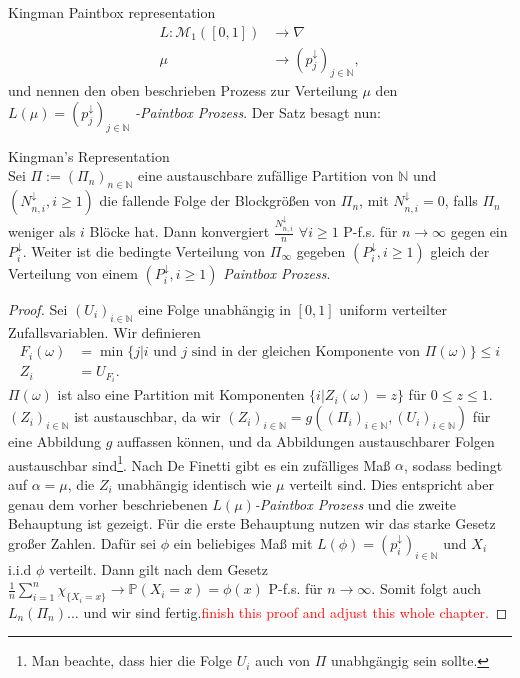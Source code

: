 \begin{section}{Kingman Paintbox representation}
\begin{align*}
L: \mathcal{M}_1([0,1]) &\to \nabla \\
\mu \hspace{20pt} &\to (p_j^\downarrow)_{j \in \mathbb{N}},
\end{align*}
und nennen den oben beschrieben Prozess zur Verteilung $\mu$ den $L(\mu) = (p_j^\downarrow)_{j \in \mathbb{N}}$ \textit{-Paintbox Prozess}. Der Satz besagt nun:
\begin{theorem}
\textnormal{Kingman's Representation}\\
    Sei $\Pi := (\Pi_n)_{n \in \mathbb{N}}$ eine austauschbare zufällige Partition von $\mathbb{N}$ und $(N^{\downarrow}_{n,i}, i \geq 1)$ die fallende Folge der Blockgrößen von $\Pi_n$, mit $N_{n,i}^\downarrow = 0$, falls $\Pi_n$ weniger als $i$ Blöcke hat. Dann konvergiert $\frac{N_{n,i}^\downarrow}{n} $ $ \forall i \geq 1$ P-f.s. für $n \to \infty$ gegen ein $P^\downarrow_i$. Weiter ist die bedingte Verteilung von $\Pi_\infty$ gegeben $(P_i^\downarrow, i \geq 1)$ gleich der Verteilung von einem $(P_i^\downarrow, i \geq 1)$ \textit{Paintbox Prozess}.
\end{theorem}
\begin{proof}
Sei $(U_i)_{i \in \mathbb{N}}$ eine Folge unabhängig in $[0,1]$ uniform verteilter Zufallsvariablen. Wir definieren 
\begin{align*}
F_i(\omega) &= \min{\{j| i \text{ und } j \text{ sind in der gleichen Komponente von }  \Pi(\omega)\}} \leq i \\
Z_i &= U_{F_i}.
\end{align*}
$\Pi(\omega)$ ist also eine Partition mit Komponenten $\{i| Z_i(\omega) = z\}$ für $0 \leq z \leq 1$. $(Z_i)_{i \in \mathbb{N}}$ ist austauschbar, da wir $(Z_i)_{i \in \mathbb{N}} = g((\Pi_i)_{i \in \mathbb{N}},(U_i)_{i \in \mathbb{N}})$ für eine Abbildung $g$ auffassen können, und da Abbildungen austauschbarer Folgen austauschbar sind\footnote{Man beachte, dass hier die Folge $U_i$ auch von $\Pi$ unabhgängig sein sollte.}. Nach De Finetti gibt es ein zufälliges Maß $\alpha$, sodass bedingt auf $\alpha = \mu$, die $Z_i$ unabhängig identisch wie $\mu$ verteilt sind. Dies entspricht aber genau dem vorher beschriebenen $L(\mu)$\textit{-Paintbox Prozess} und die zweite Behauptung ist gezeigt. Für die erste Behauptung nutzen wir das starke Gesetz großer Zahlen. Dafür sei $\phi$ ein beliebiges Maß mit $L(\phi) = (p^\downarrow_i)_{i \in \mathbb{N}}$ und $X_i$ i.i.d $\phi$ verteilt. Dann gilt nach dem Gesetz $\frac{1}{n}\sum_{i=1}^{n}\chi_{\{X_i = x\}} \rightarrow \mathbb{P}(X_i = x) = \phi(x)$ P-f.s. für $n \to \infty$. Somit folgt auch $L_n(\Pi_n)...$ und wir sind fertig.\textcolor{red}{finish this proof and adjust this whole chapter.}
\end{proof}

\end{section}